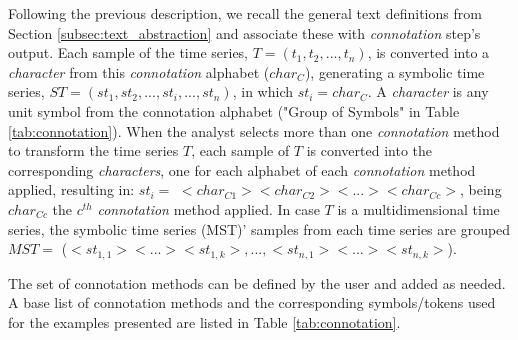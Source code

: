 Following the previous description, we recall the general text definitions from Section \ref{subsec:text_abstraction} and associate these with \textit{connotation} step's output. Each sample of the time series, $T=(t_1, t_2, ..., t_n)$,  is converted into a \textit{character} from this \textit{connotation} alphabet ($char_C$), generating a symbolic time series, $ST = (st_1, st_2, ..., st_i, ..., st_n)$, in which $st_i = char_C$. A \textit{character} is any unit symbol from the connotation alphabet ("Group of Symbols" in Table \ref{tab:connotation}). When the analyst selects more than one \textit{connotation} method to transform the time series $T$, each sample of $T$ is converted into the corresponding \textit{characters}, one for each alphabet of each \textit{connotation} method applied, resulting in: $st_i =$ $<char_{C1}><char_{C2}><...><char_{Cc}>$, being $ char_{Cc}$ the $c^{th}$ \textit{connotation} method applied. In case $T$ is a multidimensional time series, the symbolic time series (MST)' samples from each time series are grouped $MST =$ ($<st_{1,1}><...><st_{1,k}>,..., <st_{n,1}><...><st_{n,k}>$).

The set of connotation methods can be defined by the user and added as needed. A base list of connotation methods and the corresponding symbols/tokens used for the examples presented are listed in Table \ref{tab:connotation}.


